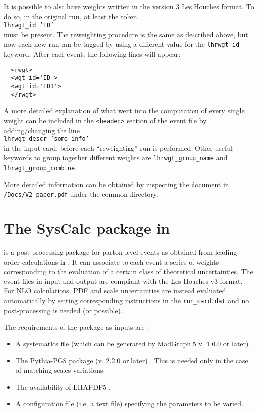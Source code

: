 \noindent It is possible to also have weights written in the version 3 Les Houches format. 
To do so, in the original run, at least the token\\
\texttt{lhrwgt\_id 'ID'}\\
\noindent must be present. The reweighting procedure is the same as described 
above, but now each new run can be tagged by using a different value 
for the \texttt{lhrwgt\_id} keyword. After each event, the following lines will 
appear: 
\small{
\begin{verbatim}
  <rwgt> 
  <wgt id='ID'>
  <wgt id='ID1'>
  </rwgt> 
\end{verbatim}}
\normalsize

A more detailed explanation of what went into the computation of every 
single weight can be included in the \texttt{<header>} section of the event 
file by adding/changing the line \\
\texttt{lhrwgt\_descr 'some info'}\\
\noindent in the input card, before each ``reweighting'' run is performed. Other 
useful keywords to group together different weights are 
\texttt{lhrwgt\_group\_name} and \texttt{lhrwgt\_group\_combine}. 

More detailed information can be obtained by inspecting the document in 
\texttt{/Docs/V2-paper.pdf} under the common  directory. 

\section{The SysCalc package in \madgraph}


\syscalc is a post-processing package for parton-level events as obtained from leading-order calculations in \madgraph.  It can associate to each event a series of weights corresponding to the evaluation of a certain class of theoretical uncertainties. The event files in input and output are compliant with  the Les Houches v3 format.
For NLO calculations, PDF and scale uncertainties are instead evaluated automatically by setting corresponding instructions in the \texttt{run\_card.dat} and no post-processing is needed (or possible).

The requirements of the package as inputs are : 
\begin{itemize}
\item A systematics file (which can be generated by MadGraph 5 v. 1.6.0 or later) \cite{Alwall:1405.0301,Alwall:2011uj}.
\item The Pythia-PGS package (v. 2.2.0 or later) \cite{Sjostrand:2006za}. This is needed only in the case of matching scales variations.
\item The availability of LHAPDF5 \cite{Whalley:2005nh}.
\item A configuration file (i.e. a text file) specifying the parameters to be varied. 
\end{itemize}

